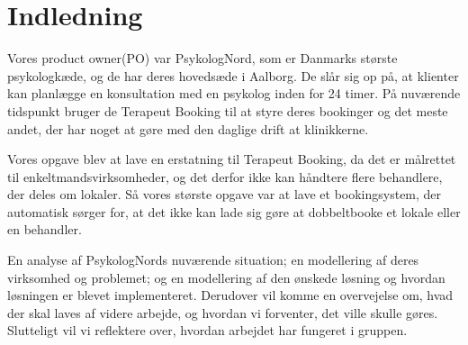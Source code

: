 \section{Indledning}
Vores product owner(PO) var PsykologNord, som er Danmarks største psykologkæde, og de har deres hovedsæde i Aalborg.
De slår sig op på, at klienter kan planlægge en konsultation med en psykolog inden for 24 timer.
På nuværende tidspunkt bruger de Terapeut Booking til at styre deres bookinger og det meste andet, der har noget at gøre med den daglige drift at klinikkerne.

Vores opgave blev at lave en erstatning til Terapeut Booking, da det er målrettet til enkeltmandsvirksomheder, og det derfor ikke kan håndtere flere behandlere, der deles om lokaler.
Så vores største opgave var at lave et bookingsystem, der automatisk sørger for, at det ikke kan lade sig gøre at dobbeltbooke et lokale eller en behandler.

En analyse af PsykologNords nuværende situation;
en modellering af deres virksomhed og problemet;
og en modellering af den ønskede løsning og hvordan løsningen er blevet implementeret.
Derudover vil komme en overvejelse om, hvad der skal laves af videre arbejde, og hvordan vi forventer, det ville skulle gøres.
Slutteligt vil vi reflektere over, hvordan arbejdet har fungeret i gruppen.

\newpage